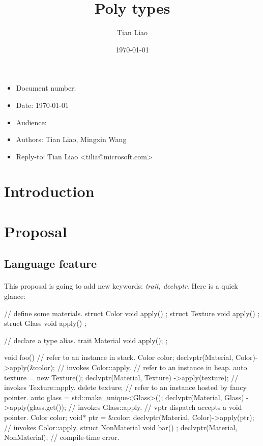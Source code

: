 \documentclass{article}
\title{Poly types}
\author{Tian Liao}
\date{\today}
\begin{document}
\maketitle
\vfill
\begin{itemize}[noitemsep]
  \item[] Document number:
  \item[] Date: \today
  \item[] Audience:
  \item[] Authors: Tian Liao, Mingxin Wang
  \item[] Reply-to: Tian Liao \textless tilia@microsoft.com\textgreater
\end{itemize}

\newpage
{}

\section{Introduction}

\section{Proposal}

\subsection{Language feature}
\paragraph{}
This proposal is going to add new keywords: \textit{trait, declvptr}. Here is a quick glance:
\begin{codeblock}
// define some materials.
struct Color { void apply() {} };
struct Texture { void apply() {} };
struct Glass { void apply() {} };

// declare a type alias.
trait Material { void apply(); };

void foo() {
  {
    // refer to an instance in stack.
    Color color;
    declvptr(Material, Color)->apply(&color); // invokes Color::apply.
  }
  {
    // refer to an instance in heap.
    auto texture = new Texture();
    declvptr(Material, Texture)
      ->apply(texture); // invokes Texture::apply.
    delete texture;
  }
  {
    // refer to an instance hosted by fancy pointer.
    auto glass = std::make_unique<Glass>();
    declvptr(Material, Glass)
      ->apply(glass.get()); // invokes Glass::apply.
  }
  {
    // vptr dispatch accepts a void pointer.
    Color color;
    void* ptr = &color;
    declvptr(Material, Color)->apply(ptr); // invokes Color::apply.
  }
  {
    struct NonMaterial { void bar() {} };
    declvptr(Material, NonMaterial); // compile-time error.
  }
}
\end{codeblock}
\end{document}
